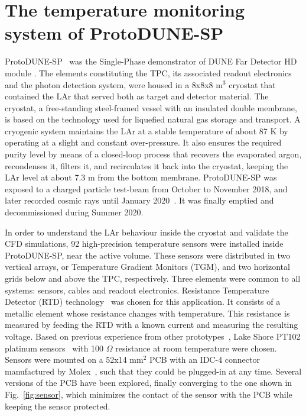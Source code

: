 \section{The temperature monitoring system of ProtoDUNE-SP}
\label{sec:protoDUNE}

\noindent ProtoDUNE-SP~\cite{pdsp_tdr} was the Single-Phase demonstrator of DUNE Far Detector HD module \cite{dune_tdr4}. %
The elements constituting the TPC, its associated readout electronics and the photon detection system, were housed in a 8x8x8 m$^3$ cryostat that contained the LAr that served both as target and detector material. The cryostat, a free-standing steel-framed vessel with an insulated double membrane, is based on the technology used for liquefied natural gas storage and transport. A cryogenic system maintains the LAr at a stable temperature of about 87 K by operating at a slight and constant over-pressure. It also ensures the required purity level by means of a closed-loop process that recovers the evaporated argon, recondenses it, filters it, and recirculates it back into the cryostat, keeping the LAr level at about 7.3 m from the bottom membrane. ProtoDUNE-SP was exposed to a charged particle test-beam from October to November 2018, and later recorded cosmic rays until January 2020~\cite{pdsp_1,pdsp_2}. It was finally emptied and decommissioned during Summer 2020.

In order to understand the LAr behaviour inside the cryostat and validate the CFD simulations, 92 high-precision temperature sensors were installed inside ProtoDUNE-SP, near the active volume. These sensors were distributed in two vertical arrays, or Temperature Gradient Monitors (TGM), and two horizontal grids below and above the TPC, respectively. Three elements were common to all systems: sensors, cables and readout electronics. Resistance Temperature Detector (RTD) technology~\cite{minco} was chosen for this application. It consists of a metallic element whose resistance changes with temperature. This resistance is measured by feeding the RTD with a known current and measuring the resulting voltage. Based on previous experience from other prototypes~\cite{35t_1}, Lake Shore PT102 platinum sensors~\cite{pt102} with 100 $\Omega$ resistance at room temperature were chosen. Sensors were mounted on a 52x14 mm$^2$ PCB with an IDC-4 connector manufactured by Molex~\cite{bib:idc4male,bib:idc4female}, such that they could be plugged-in at any time. Several versions of the PCB have been explored, finally converging to the one shown in Fig.~\ref{fig:sensor}, which minimizes the contact of the sensor with the PCB while keeping the sensor protected.

